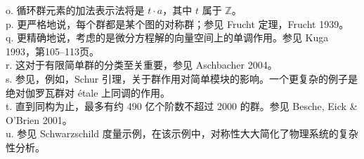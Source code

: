 o. 循环群元素的加法表示法将是 \(t \cdot a\)，其中 \(t\) 属于 \(\mathbb{Z}\)。\\   
p. 更严格地说，每个群都是某个图的对称群；参见 Frucht 定理，Frucht 1939。\\   
q. 更精确地说，考虑的是微分方程解的向量空间上的单调作用。参见 Kuga 1993，第105–113页。\\   
r. 这对于有限简单群的分类至关重要，参见 Aschbacher 2004。\\   
s. 参见，例如，Schur 引理，关于群作用对简单模块的影响。一个更复杂的例子是绝对伽罗瓦群对 étale 上同调的作用。\\   
t. 直到同构为止，最多有约 490 亿个阶数不超过 2000 的群。参见 Besche, Eick & O'Brien 2001。\\   
u. 参见 Schwarzschild 度量示例，在该示例中，对称性大大简化了物理系统的复杂性分析。